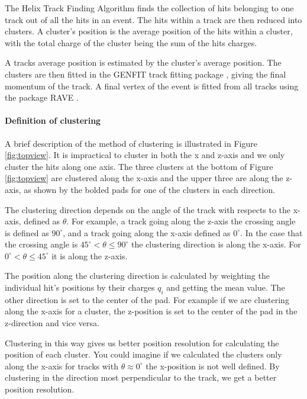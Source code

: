 \documentclass[review]{elsarticle}
\begin{document}
 The Helix Track Finding Algorithm finds the collection of hits belonging to one track out of all the hits in an event. The hits within a track are then reduced into clusters. A cluster's position is the average position of the hits within a cluster, with the total charge of the cluster being the sum of the hits charges. 
 
 A tracks average position is estimated by the cluster's average position. The clusters are then fitted in the GENFIT track fitting package \cite{genfit}, giving the final momentum of the track. A final vertex of the event is fitted from all tracks using the package RAVE \cite{rave}. 
 

\paragraph{Definition of clustering}

A brief description of the method of clustering is illustrated in Figure \ref{fig:topview}. It is impractical to cluster in both the x and z-axis and we only cluster the hits along one axis. The three clusters at the bottom of Figure \ref{fig:topview} are clustered along the x-axis and the upper three are along the z-axis, as shown by the bolded pads for one of the clusters in each direction.

 The clustering direction depends on the angle  of the track with respects to the x-axis, defined as $\theta$. For example, a track going along the z-axis the crossing angle is defined as $90^{\circ}$, and a track going along the x-axis defined as $0^{\circ}$. In the case that the crossing angle is $45^{\circ} < \theta \leq 90^{\circ} $ the clustering direction is along the x-axis. For $0^{\circ} < \theta \leq 45^{\circ}$ it is along the z-axis. 

 The position along the clustering direction is calculated by weighting the individual hit's positions by their charges $q_i$ and getting the mean value. The other direction is set to the center of the pad. For example if we are clustering along the x-axis for a cluster, the z-position is set to the center of the pad in the z-direction and vice versa. 

Clustering in this way gives us better position resolution for calculating the position of each cluster. You could imagine if we calculated the clusters only along the x-axis for tracks with $\theta \approx 0^{\circ}$ the x-position is not well defined. By clustering in the direction most perpendicular to the track, we get a better position resolution.
\end{document}
